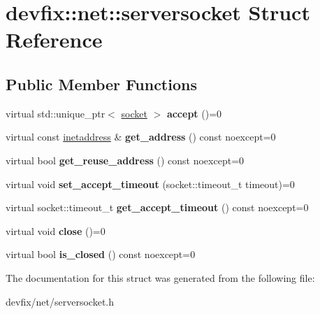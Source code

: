 \hypertarget{structdevfix_1_1net_1_1serversocket}{}\section{devfix\+:\+:net\+:\+:serversocket Struct Reference}
\label{structdevfix_1_1net_1_1serversocket}
\subsection*{Public Member Functions}
\begin{DoxyCompactItemize}
\item 
\mbox{\label{structdevfix_1_1net_1_1serversocket_a7b3ea6aad486060acdd1385a08f7db81}} 
virtual std\+::unique\+\_\+ptr$<$ \hyperlink{structdevfix_1_1net_1_1socket}{socket} $>$ {\bfseries accept} ()=0
\item 
\mbox{\label{structdevfix_1_1net_1_1serversocket_a087a819b8173bfa101ea65ea8a17eb8c}} 
virtual const \hyperlink{structdevfix_1_1net_1_1inetaddress}{inetaddress} \& {\bfseries get\+\_\+address} () const noexcept=0
\item 
\mbox{\label{structdevfix_1_1net_1_1serversocket_a7efdb1f57d0e482542fda50a2403230d}} 
virtual bool {\bfseries get\+\_\+reuse\+\_\+address} () const noexcept=0
\item 
\mbox{\label{structdevfix_1_1net_1_1serversocket_ae67a25cf26fe54ce7b10d07ff9219ce7}} 
virtual void {\bfseries set\+\_\+accept\+\_\+timeout} (socket\+::timeout\+\_\+t timeout)=0
\item 
\mbox{\label{structdevfix_1_1net_1_1serversocket_acde0979277bf9536f54bb0fb6a9cc881}} 
virtual socket\+::timeout\+\_\+t {\bfseries get\+\_\+accept\+\_\+timeout} () const noexcept=0
\item 
\mbox{\label{structdevfix_1_1net_1_1serversocket_ab1762c3364c8298dbac6c3dd67a1e7aa}} 
virtual void {\bfseries close} ()=0
\item 
\mbox{\label{structdevfix_1_1net_1_1serversocket_a37cc4e3ecede2a0bc52f90e49fcbe4a9}} 
virtual bool {\bfseries is\+\_\+closed} () const noexcept=0
\end{DoxyCompactItemize}


The documentation for this struct was generated from the following file\+:\begin{DoxyCompactItemize}
\item 
devfix/net/serversocket.\+h\end{DoxyCompactItemize}
